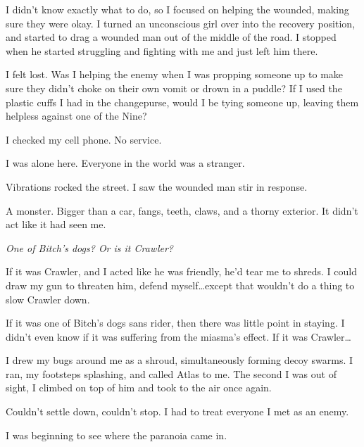 I didn't know exactly what to do, so I focused on helping the wounded, making sure they were okay.  I turned an unconscious girl over into the recovery position, and started to drag a wounded man out of the middle of the road.  I stopped when he started struggling and fighting with me and just left him there.



I felt lost.  Was I helping the enemy when I was propping someone up to make sure they didn't choke on their own vomit or drown in a puddle?  If I used the plastic cuffs I had in the changepurse, would I be tying someone up, leaving them helpless against one of the Nine?



I checked my cell phone.  No service.



I was alone here.  Everyone in the world was a stranger.



Vibrations rocked the street.  I saw the wounded man stir in response.



A monster.  Bigger than a car, fangs, teeth, claws, and a thorny exterior.  It didn't act like it had seen me.



\emph{One of Bitch's dogs?  Or is it Crawler?}



If it was Crawler, and I acted like he was friendly, he'd tear me to shreds.  I could draw my gun to threaten him, defend myself\ldots except that wouldn't do a thing to slow Crawler down.



If it was one of Bitch's dogs sans rider, then there was little point in staying.  I didn't even know if it was suffering from the miasma's effect.  If it was Crawler\ldots



I drew my bugs around me as a shroud, simultaneously forming decoy swarms.  I ran, my footsteps splashing, and called Atlas to me.  The second I was out of sight, I climbed on top of him and took to the air once again.



Couldn't settle down, couldn't stop.  I had to treat everyone I met as an enemy.



I was beginning to see where the paranoia came in.




